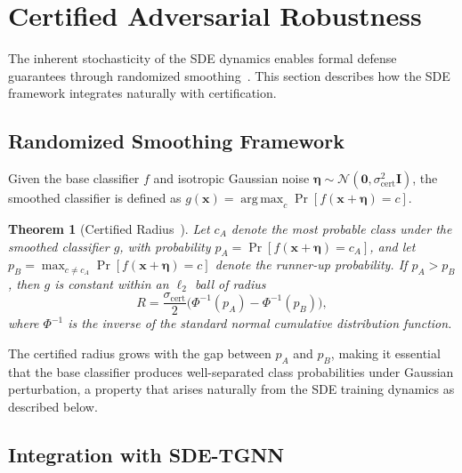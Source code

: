 \documentclass[journal]{IEEEtran}
\newcommand{\N}{\mathcal{N}}
\DeclareMathOperator*{\argmax}{arg\,max}
\newtheorem{theorem}{Theorem}
\begin{document}
\section{Certified Adversarial Robustness}
\label{sec:robustness}

The inherent stochasticity of the SDE dynamics enables formal defense guarantees through randomized smoothing~\cite{cohen2019certified}. This section describes how the SDE framework integrates naturally with certification.

\subsection{Randomized Smoothing Framework}

Given the base classifier $f$ and isotropic Gaussian noise $\boldsymbol{\eta} \sim \N(\mathbf{0}, \sigma_{\mathrm{cert}}^2 \mathbf{I})$, the smoothed classifier is defined as $g(\mathbf{x}) = \argmax_c \Pr[f(\mathbf{x} + \boldsymbol{\eta}) = c]$.

\begin{theorem}[Certified Radius~\cite{cohen2019certified}]
\label{thm:certified}
Let $c_A$ denote the most probable class under the smoothed classifier $g$, with probability $p_A = \Pr[f(\mathbf{x} + \boldsymbol{\eta}) = c_A]$, and let $p_B = \max_{c \neq c_A} \Pr[f(\mathbf{x} + \boldsymbol{\eta}) = c]$ denote the runner-up probability. If $p_A > p_B$, then $g$ is constant within an $\ell_2$ ball of radius
\begin{equation}
R = \frac{\sigma_{\mathrm{cert}}}{2}\big(\Phi^{-1}(p_A) - \Phi^{-1}(p_B)\big),
\label{eq:certified_radius}
\end{equation}
where $\Phi^{-1}$ is the inverse of the standard normal cumulative distribution function.
\end{theorem}

The certified radius grows with the gap between $p_A$ and $p_B$, making it essential that the base classifier produces well-separated class probabilities under Gaussian perturbation, a property that arises naturally from the SDE training dynamics as described below.

\subsection{Integration with SDE-TGNN}
\end{document}
